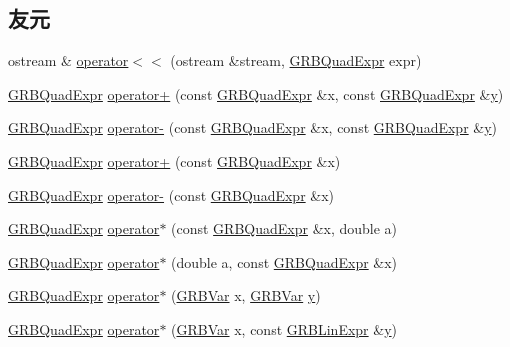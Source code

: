 \subsection*{友元}
\begin{DoxyCompactItemize}
\item 
ostream \& \hyperlink{classGRBQuadExpr_a7f706660078044ff3455e1aee30e3efd}{operator$<$$<$} (ostream \&stream, \hyperlink{classGRBQuadExpr}{G\+R\+B\+Quad\+Expr} expr)
\item 
\hyperlink{classGRBQuadExpr}{G\+R\+B\+Quad\+Expr} \hyperlink{classGRBQuadExpr_ad6605abfc8a5cef7dd87f27763c58b1b}{operator+} (const \hyperlink{classGRBQuadExpr}{G\+R\+B\+Quad\+Expr} \&x, const \hyperlink{classGRBQuadExpr}{G\+R\+B\+Quad\+Expr} \&\hyperlink{classes_8txt_a52673b1e0cce0104e52dcd12727f211e}{y})
\item 
\hyperlink{classGRBQuadExpr}{G\+R\+B\+Quad\+Expr} \hyperlink{classGRBQuadExpr_a8fbf2b063848eacd45ec75367f67ee22}{operator-\/} (const \hyperlink{classGRBQuadExpr}{G\+R\+B\+Quad\+Expr} \&x, const \hyperlink{classGRBQuadExpr}{G\+R\+B\+Quad\+Expr} \&\hyperlink{classes_8txt_a52673b1e0cce0104e52dcd12727f211e}{y})
\item 
\hyperlink{classGRBQuadExpr}{G\+R\+B\+Quad\+Expr} \hyperlink{classGRBQuadExpr_ae0d5fe423dee4abd52ada4a39a0fdd58}{operator+} (const \hyperlink{classGRBQuadExpr}{G\+R\+B\+Quad\+Expr} \&x)
\item 
\hyperlink{classGRBQuadExpr}{G\+R\+B\+Quad\+Expr} \hyperlink{classGRBQuadExpr_a1ff9c32f10a2d3d9f436b9795a2f3e6c}{operator-\/} (const \hyperlink{classGRBQuadExpr}{G\+R\+B\+Quad\+Expr} \&x)
\item 
\hyperlink{classGRBQuadExpr}{G\+R\+B\+Quad\+Expr} \hyperlink{classGRBQuadExpr_aaf8f02a342ae05dfa30e8dea524b33c1}{operator$\ast$} (const \hyperlink{classGRBQuadExpr}{G\+R\+B\+Quad\+Expr} \&x, double a)
\item 
\hyperlink{classGRBQuadExpr}{G\+R\+B\+Quad\+Expr} \hyperlink{classGRBQuadExpr_a608da5b524fe50b076f9d0550061cbdc}{operator$\ast$} (double a, const \hyperlink{classGRBQuadExpr}{G\+R\+B\+Quad\+Expr} \&x)
\item 
\hyperlink{classGRBQuadExpr}{G\+R\+B\+Quad\+Expr} \hyperlink{classGRBQuadExpr_a59d20d5a9262153ac5570a9a9c4ea281}{operator$\ast$} (\hyperlink{classGRBVar}{G\+R\+B\+Var} x, \hyperlink{classGRBVar}{G\+R\+B\+Var} \hyperlink{classes_8txt_a52673b1e0cce0104e52dcd12727f211e}{y})
\item 
\hyperlink{classGRBQuadExpr}{G\+R\+B\+Quad\+Expr} \hyperlink{classGRBQuadExpr_a5257312977e80efa2652ee13b0e2fd23}{operator$\ast$} (\hyperlink{classGRBVar}{G\+R\+B\+Var} x, const \hyperlink{classGRBLinExpr}{G\+R\+B\+Lin\+Expr} \&\hyperlink{classes_8txt_a52673b1e0cce0104e52dcd12727f211e}{y})

\end{DoxyCompactItemize}
